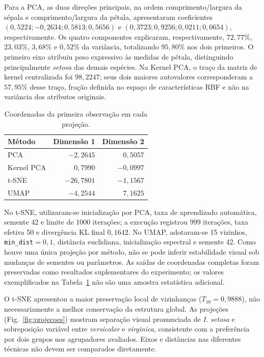 \documentclass[conference,a4paper]{IEEEtran}
\begin{document}
Para a PCA, as duas direções principais, na ordem comprimento/largura da sépala e comprimento/largura da pétala, apresentaram coeficientes $(0{,}5224;-0{,}2634;0{,}5813;0{,}5656)$ e $(0{,}3723;0{,}9256;0{,}0211;0{,}0654)$, respectivamente. Os quatro componentes explicaram, respectivamente, $72{,}77\%$, $23{,}03\%$, $3{,}68\%$ e $0{,}52\%$ da variância, totalizando $95{,}80\%$ nos dois primeiros. O primeiro eixo atribuiu peso expressivo às medidas de pétala, distinguindo principalmente \emph{setosa} das demais espécies. Na Kernel PCA, o traço da matriz de kernel centralizada foi $98{,}2247$; seus dois maiores autovalores corresponderam a $57{,}95\%$ desse traço, fração definida no espaço de características RBF e não na variância dos atributos originais.

\begin{table}[!t]
\caption{Coordenadas da primeira observação em cada projeção.}
\label{tab:coords}
\centering\footnotesize
\begin{tabular}{@{}lrr@{}}
\toprule
Método & Dimensão 1 & Dimensão 2 \\
\midrule
PCA & $-2{,}2645$ & $0{,}5057$ \\
Kernel PCA & $0{,}7990$ & $-0{,}0997$ \\
t-SNE & $-26{,}7801$ & $-1{,}1567$ \\
UMAP & $-4{,}2544$ & $7{,}1625$ \\
\bottomrule
\end{tabular}
\end{table}

No t-SNE, utilizaram-se inicialização por PCA, taxa de aprendizado automática, semente 42 e limite de 1000 iterações; a execução registrou 999 iterações, taxa efetiva 50 e divergência KL final $0{,}1642$. No UMAP, adotaram-se 15 vizinhos, \texttt{min\_dist}$=0{,}1$, distância euclidiana, inicialização espectral e semente 42. Como houve uma única projeção por método, não se pode inferir estabilidade visual sob mudanças de sementes ou parâmetros. As saídas de coordenadas completas foram preservadas como resultados suplementares do experimento; os valores exemplificados na Tabela~\ref{tab:coords} não são uma amostra estatística adicional.

O t-SNE apresentou a maior preservação local de vizinhanças ($T_{10}=0{,}9888$), não necessariamente a melhor conservação da estrutura global. As projeções (Fig.~\ref{fig:projecoes}) mostram separação visual pronunciada de \emph{I. setosa} e sobreposição variável entre \emph{versicolor} e \emph{virginica}, consistente com a preferência por dois grupos nos agrupadores avaliados. Eixos e distâncias nas diferentes técnicas não devem ser comparados diretamente.
\end{document}
